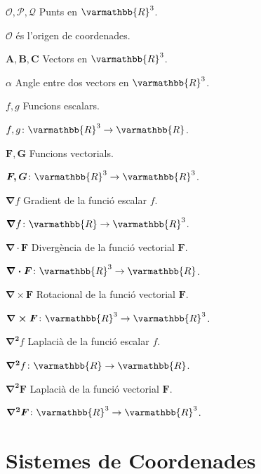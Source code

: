 \documentclass[catalan,a4paper,twoside,11pt]{article}
\begin{document}
\begin{list}{}
   \item[$\mathscr{O}, \mathscr{P}, \mathscr{Q}$] Punts en $\varmathbb{R}^3$. 
   
   $\mathscr{O}$ és l'origen de coordenades.

   \item[$\boldsymbol{A,B,C}$] Vectors en $\varmathbb{R}^3$.

   \item[$\alpha$] Angle entre dos vectors en $\varmathbb{R}^3$.

   \item[$f,g$] Funcions escalars.

   $f,g \colon \varmathbb{R}^3\rightarrow\varmathbb{R}$.

   \item[$\boldsymbol{F,G}$] Funcions vectorials.

   $\boldsymbol{F,G}\colon\varmathbb{R}^3\rightarrow\varmathbb{R}^3$.

   \item[$\boldsymbol{\nabla}f$] Gradient de la funció escalar $f$.

   $\boldsymbol{\nabla}f\colon\varmathbb{R}\rightarrow\varmathbb{R}^3$.

   \item[$\boldsymbol{\nabla\cdot F}$] Divergència de la funció vectorial $\boldsymbol{F}$.

   $\boldsymbol{\nabla\cdot F}\colon \varmathbb{R}^3\rightarrow\varmathbb{R}$.

   \item[$\boldsymbol{\nabla\times F}$] Rotacional de la funció vectorial $\boldsymbol{F}$.

   $\boldsymbol{\nabla\times F}\colon   \varmathbb{R}^3\rightarrow\varmathbb{R}^3$.

   \item[$\boldsymbol{\nabla^2}f$] Laplacià de la funció escalar $f$.

   $\boldsymbol{\nabla^2}f\colon \varmathbb{R}\rightarrow\varmathbb{R}$.

   \item[$\boldsymbol{\nabla^2F}$] Laplacià de la funció vectorial $\boldsymbol{F}$.

    $\boldsymbol{\nabla^2F}\colon \varmathbb{R}^3\rightarrow\varmathbb{R}^3$.
\end{list}


\section{Sistemes de Coordenades}
\end{document}
